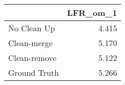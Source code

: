 \begin{tabular}{lr}
\toprule
{} & LFR_om_1 \\
\midrule
No Clean Up  &    4.415 \\
Clean-merge  &    5.170 \\
Clean-remove &    5.122 \\
Ground Truth &    5.266 \\
\bottomrule
\end{tabular}
